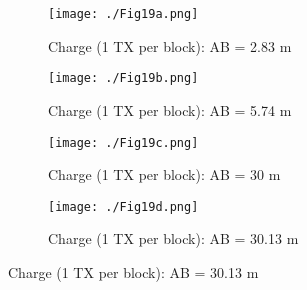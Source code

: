 \documentclass[preprint,authoryear,12pt]{elsarticle}
\providecommand{\DIFaddbeginFL}{} %
\providecommand{\DIFaddendFL}{} %
\providecommand{\DIFdelbeginFL}{} %
\providecommand{\DIFdelendFL}{} %
\begin{document}
\begin{figure} [htp]
   \begin{center}
      \begin{subfigure}{0.6\linewidth}
         \DIFdelbeginFL %
\DIFdelendFL \DIFaddbeginFL \texttt{[image: ./Fig19a.png]}
         \DIFaddendFL \caption{Charge (1 TX per block): AB = 2.83 m}
         \label{fig:SurveyDesign_Charge_1TxPerBlk_AB_2o83m}
      \end{subfigure}

      \begin{subfigure}{0.6\linewidth}
         \DIFdelbeginFL %
\DIFdelendFL \DIFaddbeginFL \texttt{[image: ./Fig19b.png]}
         \DIFaddendFL \caption{Charge (1 TX per block): AB = 5.74 m}
         \label{fig:SurveyDesign_Charge_1TxPerBlk_AB_5o74m}
      \end{subfigure}

      \begin{subfigure}{0.6\linewidth}
         \DIFdelbeginFL %
\DIFdelendFL \DIFaddbeginFL \texttt{[image: ./Fig19c.png]}
         \DIFaddendFL \caption{Charge (1 TX per block): AB = 30 m}
         \label{fig:SurveyDesign_Charge_1TxPerBlk_AB_30m}
      \end{subfigure}

      \begin{subfigure}{0.6\linewidth}
         \DIFdelbeginFL %
\DIFdelendFL \DIFaddbeginFL \texttt{[image: ./Fig19d.png]}
         \DIFaddendFL \caption{Charge (1 TX per block): AB = 30.13 m}
         \label{fig:SurveyDesign_Charge_1TxPerBlk_AB_30o13m}
      \end{subfigure}


\end{center}
\end{figure}
\end{document}
